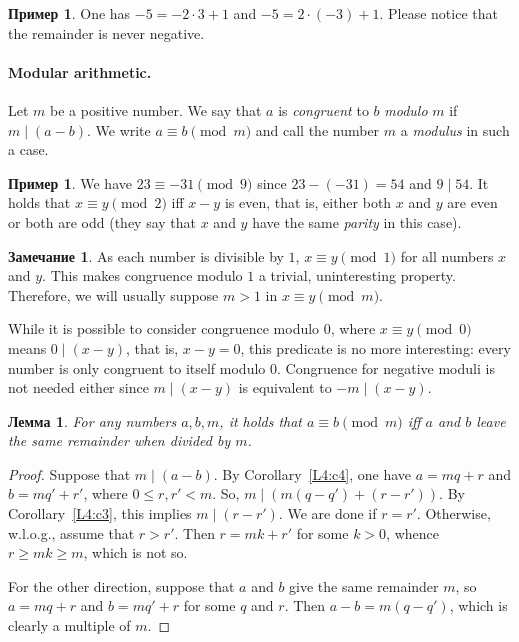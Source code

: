 \documentclass[12pt,notitlepage]{article}
\theoremstyle{plain}
\newtheorem{lemma}[thm]{Лемма}
\theoremstyle{definition}
\newtheorem{exm}[thm]{Пример}
\newtheorem{rem}[thm]{Замечание}
\theoremstyle{plain}
\newcommand{\1}{\mathbf{1}}
\newcommand{\0}{\mathbf{0}}
\newcommand{\dvd}{\mathop{\mid}}
\newcommand{\mcomm}[1]{}
\begin{document}
\begin{exm}
	One has $-5 = -2 \cdot 3 + 1$ and $-5 = 2 \cdot (-3) + 1$. Please notice that the remainder is never negative.
\end{exm}

\paragraph{Modular arithmetic.}

Let $m$ be a positive number. We say that $a$ is \emph{congruent} to $b$ \emph{modulo} $m$ if $m \dvd (a - b)$.  We write $a \equiv b \pmod m$ and call the number $m$ a \emph{modulus} in such a case.

\begin{exm}
	We have $23 \equiv -31 \pmod 9$ since $23 - (-31) = 54$ and $9 \dvd 54$. It holds that $x \equiv y \pmod 2$ iff $x - y$ is even, that is, either both $x$ and $y$ are even or both are odd (they say that $x$ and $y$ have the same \emph{parity} in this case).
\end{exm}

\begin{rem}
	As each number is divisible by $1$, $x \equiv y \pmod 1$ for all numbers $x$ and $y$. This makes congruence modulo $1$ a trivial, uninteresting property. Therefore, we will usually suppose $m > 1$ in $x \equiv y \pmod m$.
	
	While it is possible to consider congruence modulo $0$, where $x \equiv y \pmod 0$ means $0 \dvd (x - y)$, that is, $x - y = 0$, this predicate is no more interesting: every number is only congruent to itself modulo $0$. Congruence for negative moduli is not needed either since $m \dvd (x - y)$ is equivalent to $-m \dvd (x - y)$.
\end{rem}

\mcomm{In practice, we also used simplified notation $a \equiv b\ (m)$ as well. Many students are already familiar with this concept but prefer to define it in terms of remainders. The Instructor should underline that each of these two equivalent definitions may be preferable to the other one in various situations.}

\begin{lemma}\label{L4:l5}
	For any numbers $a, b, m$, it holds that $a \equiv b \pmod m$ iff $a$ and $b$ leave the same remainder when divided by $m$.
\end{lemma}
\begin{proof}
	Suppose that $m \dvd (a - b)$. By Corollary~\ref{L4:c4}, one have $a = m q + r$ and $b = m q' + r'$, where $0 \leq r, r' < m$. So, $m \dvd (m(q - q') + (r - r'))$. By Corollary~\ref{L4:c3}, this implies $m \dvd (r - r')$. We are done if $r = r'$. Otherwise, w.l.o.g., assume that $r > r'$. Then $r = mk + r'$ for some $k > 0$, whence $r \geq mk \geq m$, which is not so.
	
	For the other direction, suppose that $a$ and $b$ give the same remainder $m$, so $a = m q + r$ and $b = m q' + r$ for some $q$ and $r$. Then $a - b = m(q - q')$, which is clearly a multiple of $m$.
\end{proof}
\end{document}
